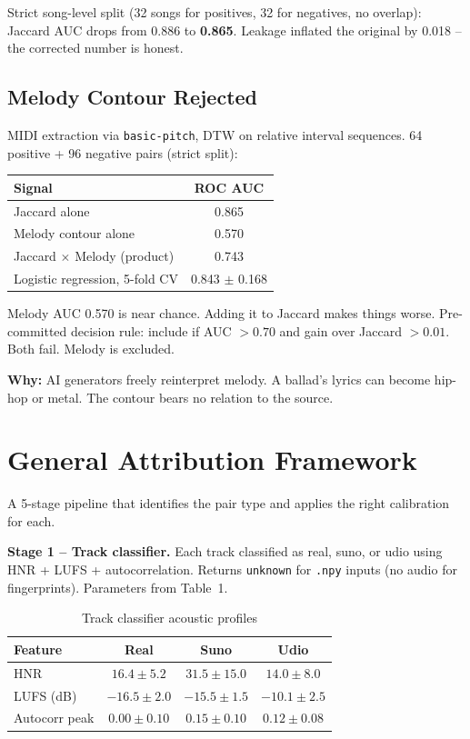 \documentclass[10pt,a4paper]{article}
\begin{document}
Strict song-level split (32 songs for positives, 32 for negatives,
no overlap): Jaccard AUC drops from 0.886 to \textbf{0.865}.
Leakage inflated the original by 0.018 -- the corrected number is honest.

\subsection{Melody Contour Rejected}

MIDI extraction via \texttt{basic-pitch}, DTW on relative interval sequences.
64 positive + 96 negative pairs (strict split):

\begin{center}
\begin{tabular}{lc}
\toprule
Signal & ROC AUC \\
\midrule
Jaccard alone & 0.865 \\
Melody contour alone & 0.570 \\
Jaccard $\times$ Melody (product) & 0.743 \\
Logistic regression, 5-fold CV & 0.843 $\pm$ 0.168 \\
\bottomrule
\end{tabular}
\end{center}

Melody AUC 0.570 is near chance. Adding it to Jaccard makes things
worse. Pre-committed decision rule: include if AUC $> 0.70$ and gain
over Jaccard $> 0.01$. Both fail. Melody is excluded.

\textbf{Why:} AI generators freely reinterpret melody. A ballad's lyrics
can become hip-hop or metal. The contour bears no relation to the source.

\section{General Attribution Framework}

A 5-stage pipeline that identifies the pair type and applies the right
calibration for each.

\textbf{Stage 1 -- Track classifier.}
Each track classified as real, suno, or udio using HNR + LUFS + autocorrelation.
Returns \texttt{unknown} for \texttt{.npy} inputs (no audio for fingerprints).
Parameters from Table~1.

\begin{table}[h]
\centering\caption{Track classifier acoustic profiles}
\begin{tabular}{lccc}
\toprule
Feature & Real & Suno & Udio \\
\midrule
HNR & $16.4 \pm 5.2$ & $31.5 \pm 15.0$ & $14.0 \pm 8.0$ \\
LUFS (dB) & $-16.5 \pm 2.0$ & $-15.5 \pm 1.5$ & $-10.1 \pm 2.5$ \\
Autocorr peak & $0.00 \pm 0.10$ & $0.15 \pm 0.10$ & $0.12 \pm 0.08$ \\
\bottomrule
\end{tabular}
\end{table}
\end{document}
